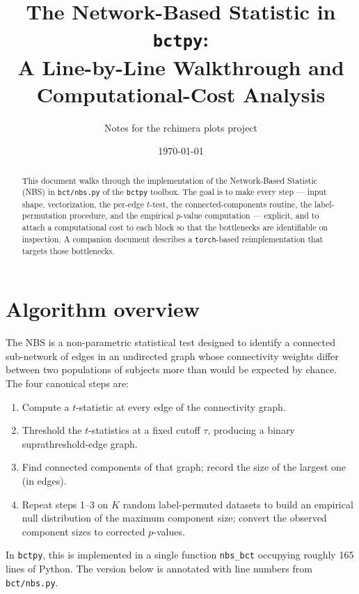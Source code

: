 \documentclass[11pt]{article}
\title{The Network-Based Statistic in \texttt{bctpy}:\\
A Line-by-Line Walkthrough and Computational-Cost Analysis}
\author{Notes for the rchimera plots project}
\date{\today}
\begin{document}
\maketitle

\begin{abstract}
This document walks through the implementation of the Network-Based Statistic (NBS) in \texttt{bct/nbs.py} of the \texttt{bctpy} toolbox. The goal is to make every step --- input shape, vectorization, the per-edge $t$-test, the connected-components routine, the label-permutation procedure, and the empirical $p$-value computation --- explicit, and to attach a computational cost to each block so that the bottlenecks are identifiable on inspection. A companion document describes a \texttt{torch}-based reimplementation that targets those bottlenecks.
\end{abstract}

\tableofcontents
\bigskip

\section{Algorithm overview}

The NBS \cite{Zalesky2010} is a non-parametric statistical test designed to identify a connected sub-network of edges in an undirected graph whose connectivity weights differ between two populations of subjects more than would be expected by chance. The four canonical steps are:

\begin{enumerate}[leftmargin=2.0em]
\item Compute a $t$-statistic at every edge of the connectivity graph.
\item Threshold the $t$-statistics at a fixed cutoff $\tau$, producing a binary suprathreshold-edge graph.
\item Find connected components of that graph; record the size of the largest one (in edges).
\item Repeat steps 1--3 on $K$ random label-permuted datasets to build an empirical null distribution of the maximum component size; convert the observed component sizes to corrected $p$-values.
\end{enumerate}

In \texttt{bctpy}, this is implemented in a single function \texttt{nbs\_bct} occupying roughly 165 lines of Python. The version below is annotated with line numbers from \texttt{bct/nbs.py}.
\end{document}
